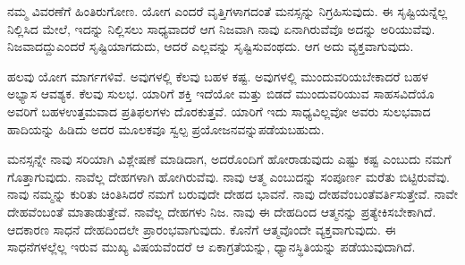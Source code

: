 \vskip 6pt

ನಮ್ಮ ವಿವರಣೆಗೆ ಹಿಂತಿರುಗೋಣ. ಯೋಗ ಎಂದರೆ ವೃತ್ತಿಗಳಾಗದಂತೆ ಮನಸ್ಸನ್ನು ನಿಗ್ರಹಿಸುವುದು. ಈ ಸೃಷ್ಟಿಯನ್ನೆಲ್ಲ ನಿಲ್ಲಿಸಿದ ಮೇಲೆ, ಇದನ್ನು ನಿಲ್ಲಿಸಲು ಸಾಧ್ಯ\-ವಾದರೆ ಆಗ ನಿಜವಾಗಿ ನಾವು ಏನಾಗಿರುವೆವೊ ಅದನ್ನು ಅರಿಯುವೆವು. ನಿಜವಾದದ್ದು\break ಎಂದರೆ ಸೃಷ್ಟಿಯಾಗದುದು, ಆದರೆ ಎಲ್ಲವನ್ನು ಸೃಷ್ಟಿಸುವಂಥದು. ಆಗ ಅದು ವ್ಯಕ್ತವಾಗುವುದು.

ಹಲವು ಯೋಗ ಮಾರ್ಗಗಳಿವೆ. ಅವುಗಳಲ್ಲಿ ಕೆಲವು ಬಹಳ ಕಷ್ಟ. ಅವುಗಳಲ್ಲಿ ಮುಂದುವರಿಯಬೇಕಾದರೆ ಬಹಳ ಅಭ್ಯಾಸ ಆವಶ್ಯಕ. ಕೆಲವು ಸುಲಭ. ಯಾರಿಗೆ ಶಕ್ತಿ ಇದೆಯೋ ಮತ್ತು ಬಿಡದೆ ಮುಂದುವರಿಯುವ ಸಾಹಸವಿದೆಯೊ ಅವರಿಗೆ ಬಹಳ\break ಉತ್ತಮವಾದ ಪ್ರತಿಫಲಗಳು ದೊರಕುತ್ತವೆ. ಯಾರಿಗೆ ಇದು ಸಾಧ್ಯವಿಲ್ಲವೋ ಅವರು ಸುಲಭವಾದ ಹಾದಿಯನ್ನು ಹಿಡಿದು ಅದರ ಮೂಲಕವೂ ಸ್ವಲ್ಪ ಪ್ರಯೋಜನವನ್ನು\break ಪಡೆಯಬಹುದು.

ಮನಸ್ಸನ್ನೇ ನಾವು ಸರಿಯಾಗಿ ವಿಶ್ಲೇಷಣೆ ಮಾಡಿದಾಗ, ಅದರೊಂದಿಗೆ ಹೋರಾಡುವುದು ಎಷ್ಟು ಕಷ್ಟ ಎಂಬುದು ನಮಗೆ ಗೊತ್ತಾಗುವುದು. ನಾವೆಲ್ಲ ದೇಹಗಳಾಗಿ ಹೋಗಿರುವೆವು. ನಾವು ಆತ್ಮ ಎಂಬುದನ್ನು ಸಂಪೂರ್ಣ ಮರೆತು ಬಿಟ್ಟಿರುವೆವು. ನಾವು ನಮ್ಮನ್ನು ಕುರಿತು ಚಿಂತಿಸಿದರೆ ನಮಗೆ ಬರುವುದೇ ದೇಹದ ಭಾವನೆ. ನಾವು ದೇಹವೆಂಬಂತೆ\break ವರ್ತಿಸುತ್ತೇವೆ. ನಾವೇ ದೇಹವೆಂಬಂತೆ ಮಾತಾಡುತ್ತೇವೆ. ನಾವೆಲ್ಲ ದೇಹಗಳು ನಿಜ. ನಾವು ಈ ದೇಹದಿಂದ ಆತ್ಮನನ್ನು ಪ್ರತ್ಯೇಕಿಸಬೇಕಾಗಿದೆ. ಆದಕಾರಣ ಸಾಧನೆ ದೇಹದಿಂದಲೇ ಪ್ರಾರಂಭವಾಗುವುದು. ಕೊನೆಗೆ ಆತ್ಮವೊಂದೇ ವ್ಯಕ್ತವಾಗುವುದು. ಈ ಸಾಧನೆಗಳಲ್ಲೆಲ್ಲ ಇರುವ ಮುಖ್ಯ ವಿಷಯವೆಂದರೆ ಆ ಏಕಾಗ್ರತೆಯನ್ನು, ಧ್ಯಾನಸ್ಥಿತಿಯನ್ನು ಪಡೆಯುವುದಾಗಿದೆ.

